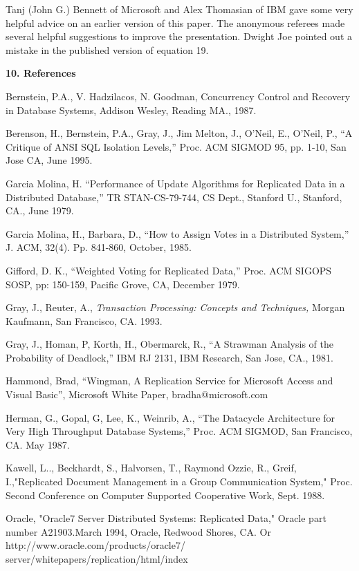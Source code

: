 \documentclass[a4paper,11pt,twoside,openright]{article}
\begin{document}
Tanj (John G.) Bennett of Microsoft and Alex Thomasian of IBM gave some
very helpful advice on an earlier version of this paper. The anonymous
referees made several helpful suggestions to improve the presentation.
Dwight Joe pointed out a mistake in the published version of equation
19.

\textbf{10. References}

Bernstein, P.A., V. Hadzilacos, N. Goodman, Concurrency Control and
Recovery in Database Systems, Addison Wesley, Reading MA., 1987.

Berenson, H., Bernstein, P.A., Gray, J., Jim Melton, J., O'Neil, E.,
O'Neil, P., ``A Critique of ANSI SQL Isolation Levels,'' Proc. ACM
SIGMOD 95, pp. 1-10, San Jose CA, June 1995.

Garcia Molina, H. ``Performance of Update Algorithms for Replicated Data
in a Distributed Database,'' TR STAN-CS-79-744, CS Dept., Stanford U.,
Stanford, CA., June 1979.

Garcia Molina, H., Barbara, D., ``How to Assign Votes in a Distributed
System,'' J. ACM, 32(4). Pp. 841-860, October, 1985.

Gifford, D. K., ``Weighted Voting for Replicated Data,'' Proc. ACM
SIGOPS SOSP, pp: 150-159, Pacific Grove, CA, December 1979.

Gray, J., Reuter, A., \emph{Transaction Processing: Concepts and
Techniques,} Morgan Kaufmann, San Francisco, CA. 1993.

Gray, J., Homan, P, Korth, H., Obermarck, R., ``A Strawman Analysis of
the Probability of Deadlock,'' IBM RJ 2131, IBM Research, San Jose, CA.,
1981.

Hammond, Brad, ``Wingman, A Replication Service for Microsoft Access and
Visual Basic'', Microsoft White Paper, bradha@microsoft.com

Herman, G., Gopal, G, Lee, K., Weinrib, A., ``The Datacycle Architecture
for Very High Throughput Database Systems,'' Proc. ACM SIGMOD, San
Francisco, CA. May 1987.

Kawell, L.., Beckhardt, S., Halvorsen, T., Raymond Ozzie, R., Greif,
I.,"Replicated Document Management in a Group Communication System,"
Proc. Second Conference on Computer Supported Cooperative Work, Sept.
1988.

Oracle, "Oracle7 Server Distributed Systems: Replicated Data," Oracle
part number A21903.March 1994, Oracle, Redwood Shores, CA. Or
http://www.oracle.com/products/oracle7/
server/whitepapers/replication/html/index
\end{document}
